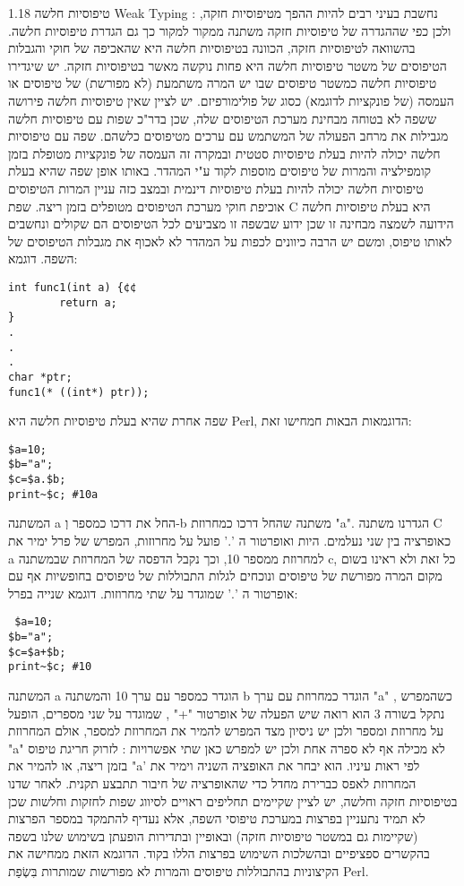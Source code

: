       1.18 טיפוסיות חלשה Weak Typing :
      נחשבת בעיני רבים להיות ההפך מטיפוסיות חזקה, ולכן כפי שההגדרה של טיפוסיות חזקה משתנה ממקור למקור כך גם הגדרת טיפוסיות חלשה.
      בהשוואה לטיפוסיות חזקה, הכוונה בטיפוסיות חלשה היא שהאכיפה של חוקי והגבלות הטיפוסים של משטר טיפוסיות חלשה היא פחות נוקשה מאשר בטיפוסיות חזקה.
      יש שיגדירו טיפוסיות חלשה כמשטר טיפוסים שבו יש המרה משתמעת (לא מפורשת) של טיפוסים או העמסה (של פונקציות לדוגמא) כסוג של פולימורפיזם. יש לציין שאין טיפוסיות חלשה פירושה ששפה לא בטוחה מבחינת מערכת הטיפוסים שלה, שכן בדר"כ שפות עם טיפוסיות חלשה מגבילות את מרחב הפעולה של המשתמש עם ערכים מטיפוסים כלשהם. שפה עם טיפוסיות חלשה יכולה להיות בעלת טיפוסיות סטטית ובמקרה זה העמסה של פונקציות מטופלת בזמן קומפילציה והמרות של טיפוסים מוספות לקוד ע"י המהדר.
      באותו אופן שפה שהיא בעלת טיפוסיות חלשה יכולה להיות בעלת טיפוסיות דינמית ובמצב כזה עניין המרות הטיפוסים אוכיפת חוקי מערכת הטיפוסים מטופלים בזמן ריצה.
      שפת C היא בעלת טיפוסיות חלשה הידועה לשמצה מבחינה זו שכן ידוע שבשפה זו מצביעים לכל הטיפוסים הם שקולים ונחשבים לאותו טיפוס, ומשם יש הרבה כיוונים לכפות על המהדר לא לאכוף את מגבלות הטיפוסים של השפה. דוגמא:

\begin{verbatim}
int func1(int a) {¢¢
        return a;
}
.
.
.
char *ptr;
func1(* ((int*) ptr));
\end{verbatim}

      שפה אחרת שהיא בעלת טיפוסיות חלשה היא Perl, הדוגמאות הבאות חמחישו זאת:
\begin{verbatim}
$a=10;
$b="a";
$c=$a.$b;
print~$c; #10a
\end{verbatim}

      המשתנה a החל את דרכו כמספר וְ-b משתנה שהחל דרכו כמחרוזת "a". הגדרנו משתנה C כאופרציה בין שני נעלמים. היות ואופרטור ה '.' פועל על מחרוזות, המפרש של פרל ימיר את a למחרוזת ממספר 10, וכך נקבל הדפסה של המחרוזת שבמשתנה c, כל זאת ולא ראינו בשום מקום המרה מפורשת של טיפוסים ונוכחים לגלות התבוללות של טיפוסים בחופשיות אף עם אופרטור ה '.' שמוגדר על שתי מחרוזות.
      דוגמא שנייה בפרל:
\begin{verbatim}
 $a=10;
$b="a";
$c=$a+$b;
print~$c; #10
\end{verbatim}

      המשתנה a הוגדר כמספר עם ערך 10 והמשתנה b הוגדר כמחרוזת עם ערך "a" , כשהמפרש נתקל בשורה 3 הוא רואה שיש הפעלה של אופרטור "+" , שמוגדר על שני מספרים, הופעל על מחרוזת ומספר ולכן יש ניסיון מצד המפרש להמיר את המחרוזת למספר, אולם המחרוזת "a" לא מכילה אף לא ספרה אחת ולכן יש למפרש כאן שתי אפשרויות : לזרוק חריגת טיפוס בזמן ריצה, או להמיר את "a' לפי ראות עיניו. הוא יבחר את האופציה השניה וימיר את המחרוזת לאפס כברירת מחדל כדי שהאופרציה של חיבור תתבצע תקנית.
      לאחר שדנו בטיפוסיות חזקה וחלשה, יש לציין שקיימים תחליפים ראויים לסיווג שפות לחזקות וחלשות שכן לא תמיד נתעניין בפרצות במערכת טיפוסי השפה, אלא נעדיף להתמקד במספר הפרצות (שקיימות גם במשטר טיפוסיות חזקה) ובאופיין ובתדירות הופעתן בשימוש שלנו בשפה בהקשרים ספציפיים ובהשלכות השימוש בפרצות הללו בקוד. הדוגמא הזאת ממחישה את הקיצוניות בהתבוללות טיפוסים והמרות לא מפורשות שמותרות בִּשְׂפַת Perl.

